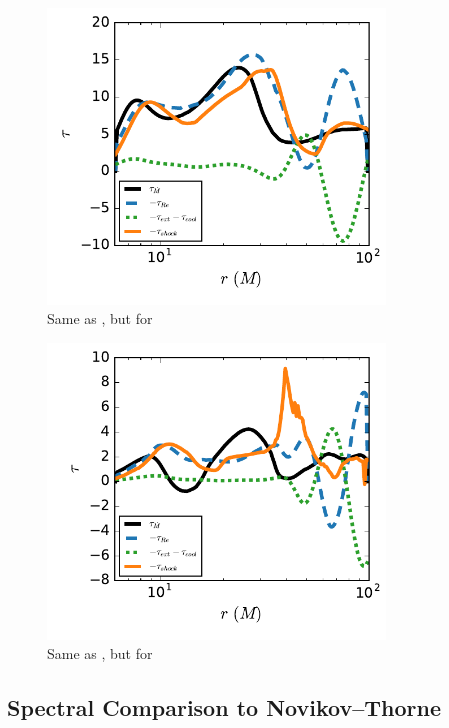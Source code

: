 \begin{figure}
\begin{center}
	\includegraphics[width=0.8\textwidth]{figures/minidisk/q011_m3_torque_r.pdf}
\end{center}
	\caption{ Same as , but for }  
\end{figure}

\begin{figure}
	\begin{center}
	\includegraphics[width=0.8\textwidth]{figures/minidisk/q011_m4_torque_r.pdf}
	\end{center}
	\caption{ Same as , but for }  
\end{figure}

\subsection{Spectral Comparison to Novikov--Thorne}

